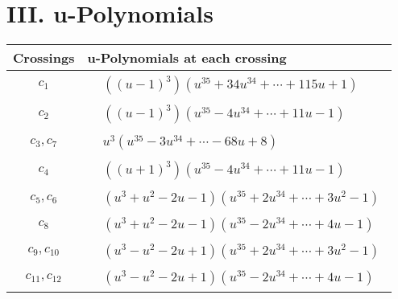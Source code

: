 \documentclass[1p]{elsarticle_modified}
\theoremstyle{definition}
\begin{document}
\newpage\renewcommand{\arraystretch}{1}
\centering \section*{ III. u-Polynomials}
\begin{tabular}{m{50pt}|m{274pt}}
Crossings & \hspace{64pt}u-Polynomials at each crossing \\
\hline $$\begin{aligned}c_{1}\end{aligned}$$&$\begin{aligned}
&((u-1)^3)(u^{35}+34 u^{34}+\cdots+115 u+1)
\end{aligned}$\\
\hline $$\begin{aligned}c_{2}\end{aligned}$$&$\begin{aligned}
&((u-1)^3)(u^{35}-4 u^{34}+\cdots+11 u-1)
\end{aligned}$\\
\hline $$\begin{aligned}c_{3},c_{7}\end{aligned}$$&$\begin{aligned}
&u^3(u^{35}-3 u^{34}+\cdots-68 u+8)
\end{aligned}$\\
\hline $$\begin{aligned}c_{4}\end{aligned}$$&$\begin{aligned}
&((u+1)^3)(u^{35}-4 u^{34}+\cdots+11 u-1)
\end{aligned}$\\
\hline $$\begin{aligned}c_{5},c_{6}\end{aligned}$$&$\begin{aligned}
&(u^3+u^2-2 u-1)(u^{35}+2 u^{34}+\cdots+3 u^2-1)
\end{aligned}$\\
\hline $$\begin{aligned}c_{8}\end{aligned}$$&$\begin{aligned}
&(u^3+u^2-2 u-1)(u^{35}-2 u^{34}+\cdots+4 u-1)
\end{aligned}$\\
\hline $$\begin{aligned}c_{9},c_{10}\end{aligned}$$&$\begin{aligned}
&(u^3- u^2-2 u+1)(u^{35}+2 u^{34}+\cdots+3 u^2-1)
\end{aligned}$\\
\hline $$\begin{aligned}c_{11},c_{12}\end{aligned}$$&$\begin{aligned}
&(u^3- u^2-2 u+1)(u^{35}-2 u^{34}+\cdots+4 u-1)
\end{aligned}$\\
\hline
\end{tabular}\newpage\renewcommand{\arraystretch}{1}
\end{document}
